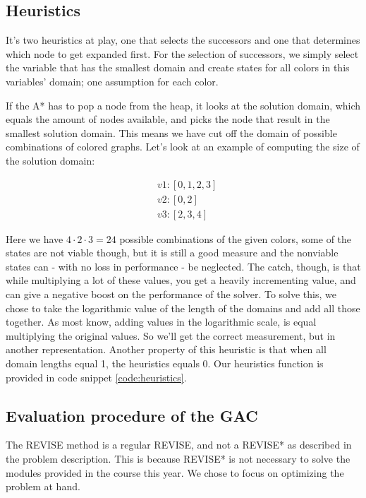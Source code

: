 \subsection*{Heuristics}
It's two heuristics at play, one that selects the successors and one that determines which node to get expanded first. For the selection of successors, we simply select the variable that has the smallest domain and create states for all colors in this variables' domain; one assumption for each color.

If the A* has to pop a node from the heap, it looks at the solution domain, which equals the amount of nodes available, and picks the node that result in the smallest solution domain. This means we have cut off the domain of possible combinations of colored graphs. Let's look at an example of computing the size of the solution domain:

\begin{align*}
	&v1: [0,1,2,3]\\
	&v2: [0,2]\\
	&v3: [2,3,4]
\end{align*}

Here we have \(4 \cdot 2 \cdot 3 = 24\) possible combinations of the given colors, some of the states are not viable though, but it is still a good measure and the nonviable states can - with no loss in performance - be neglected. The catch, though, is that while multiplying a lot of these values, you get a heavily incrementing value, and can give a negative boost on the performance of the solver. To solve this, we chose to take the logarithmic value of the length of the domains and add all those together. As most know, adding values in the logarithmic scale, is equal multiplying the original values. So we'll get the correct measurement, but in another representation. Another property of this heuristic is that when all domain lengths equal 1, the heuristics equals 0. Our heuristics function is provided in code snippet \ref{code:heuristics}.



\subsection{Evaluation procedure of the GAC}
The REVISE method is a regular REVISE, and not a REVISE* as described in the problem description. This is because REVISE* is not necessary to solve the modules provided in the course this year. We chose to focus on optimizing the problem at hand.

